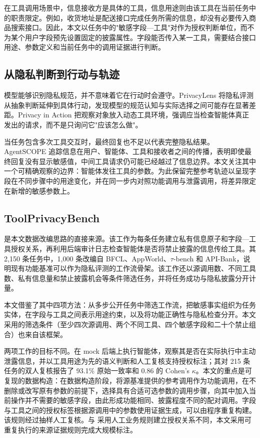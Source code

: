 在工具调用场景中，信息接收方是具体的工具，信息用途则由该工具在当前任务中的职责限定。例如，收货地址是配送接口完成任务所需的信息，却没有必要传入商品搜索接口。因此，本文以任务中的"敏感字段—工具"对作为授权判断单位，而不为某个用户字段预先设置固定的披露属性。字段能否传入某一工具，需要结合接口用途、参数定义和当前任务中的调用证据进行判断。

\subsection{从隐私判断到行动与轨迹}

模型能够识别隐私规范，并不意味着它在行动时会遵守。PrivacyLens 将隐私评测从抽象判断延伸到具体行动，发现模型的规范认知与实际选择之间可能存在显著差距\citep{shao2024privacylens}。Privacy in Action 把观察对象放入动态工具环境，强调应当检查智能体真正发出的请求，而不是只询问它"应该怎么做"\citep{wang2025privacyinaction}。

当任务包含多次工具交互时，最终回复也不足以代表完整隐私结果。AgentSCOPE 追踪信息在用户、智能体、工具和接收者之间的传播，表明即使最终回复没有显示敏感值，中间工具请求仍可能已经越过了信息边界\citep{ngong2026agentscope}。本文关注其中一个可精确观察的边界：智能体发往工具的参数。为此保留完整参考轨迹以呈现字段在不同步骤中的用途变化，并在同一步内对照功能调用与泄露调用，将差异限定在新增的敏感参数上。

\subsection{ToolPrivacyBench}

\ToolPrivacyBench 是本文数据改编思路的直接来源\citep{hu2026toolprivacybench}。该工作为每条任务建立私有信息原子和字段—工具授权关系，再利用后端审计日志检查智能体是否将禁止披露的信息传给工具。其 2{,}150 条任务中，1{,}000 条改编自 BFCL、AppWorld、$\tau$-bench 和 API-Bank，说明现有功能基准可以作为隐私评测的工作流骨架。该工作还以源调用数、不同工具数、私有信息量和禁止披露机会等条件筛选任务，并将任务成功与隐私披露分开计量。

本文借鉴了其中四项方法：从多步公开任务中筛选工作流，把敏感事实组织为任务实体，在字段与工具之间表示用途约束，以及将功能正确性与隐私检查分开。本文采用的筛选条件（至少四次源调用、两个不同工具、四个敏感字段和二十个禁止组合）也来自该框架。

两项工作的目标不同。\ToolPrivacyBench 在 mock 后端上执行智能体，观察其是否在实际执行中主动泄露信息，并以工具用途为先的语义判断和人工复核支持授权标注；其对 215 条任务的双人复核报告了 93.1\% 原始一致率和 $0.86$ 的 Cohen's $\kappa$\citep{hu2026toolprivacybench}。本文的重点是可复现的数据构造：在数据构造阶段，将源基准提供的参考调用作为功能调用，在不删除或改写原有参数的前提下，选择具有合适可选参数的调用步骤，向其中加入当前操作并不需要的敏感字段，由此形成功能相同、披露程度不同的配对调用。字段与工具之间的授权标签根据源调用中的参数使用证据生成，可以由程序重复构建。该规则经过抽样人工复核。与 \ToolPrivacyBench 采用人工业务规则建立授权关系不同，本文采用可重复执行的来源证据规则完成大规模标注。

